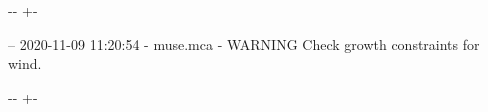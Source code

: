 \documentclass[letterpaper,10pt,english]{sphinxmanual}
\newlength\nbsphinxcodecellspacing
\begin{document}
{

\kern-\sphinxverbatimsmallskipamount\kern-\baselineskip
\kern+\FrameHeightAdjust\kern-\fboxrule
\vspace{\nbsphinxcodecellspacing}

\begin{sphinxVerbatim}[commandchars=\\\{\}]
-- 2020-11-09 11:20:54 - muse.mca - WARNING
Check growth constraints for wind.

\end{sphinxVerbatim}
}

{

\kern-\sphinxverbatimsmallskipamount\kern-\baselineskip
\kern+\FrameHeightAdjust\kern-\fboxrule
\vspace{\nbsphinxcodecellspacing}

}
\end{document}

